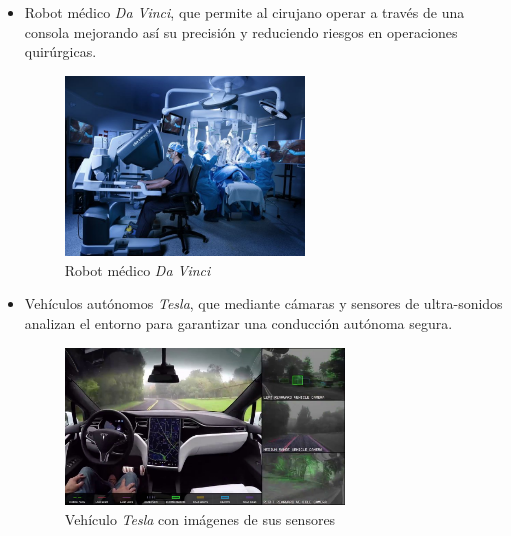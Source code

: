 \begin{itemize}
    \item Robot médico \textit{Da Vinci}, que permite al cirujano operar a través de una consola mejorando así su precisión y reduciendo riesgos en operaciones quirúrgicas. 
      \begin{figure}[H]
    \centering
    \includegraphics[width=0.6\textwidth]{img/davinci.jpg}
    \caption{Robot médico \textit{Da Vinci}} \label{fig:davinci}
    \end{figure}
    \item Vehículos autónomos \textit{Tesla}, que mediante cámaras y sensores de ultra-sonidos analizan el entorno para garantizar una conducción autónoma segura. 
    
    
       
    
    \begin{figure}[H]
        \centering
        \includegraphics[width=0.7\textwidth]{img/tesla.jpg}
        \caption{Vehículo \textit{Tesla} con imágenes de sus sensores} \label{fig:tesla}
    \end{figure}
    

\end{itemize}
